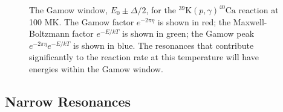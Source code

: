 \begin{figure}[t]
\caption{\label{fig:Gamow_Window}The Gamow window, $E_{0} \pm \Delta/2$, for the $^{39}\mathrm{K}(p,\gamma)^{40}\mathrm{Ca}$ reaction at 100 MK. The Gamow factor $e^{-2 \pi \eta}$ is shown in red; the Maxwell-Boltzmann factor $e^{-E/kT}$ is shown in green; the Gamow peak $e^{-2 \pi \eta} e^{-E/kT}$ is shown in blue. The resonances that contribute significantly to the reaction rate at this temperature will have energies within the Gamow window.}
\end{figure}

\subsection{Narrow Resonances} \label{subsec:narrow_resonances}


